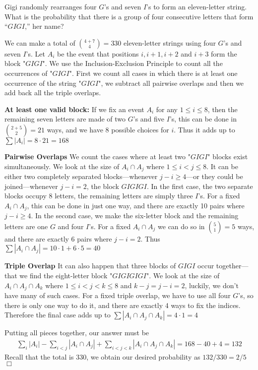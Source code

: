  \begin{problem}
     Gigi randomly rearranges four $G$’s and seven $I$’s to form an eleven-letter string. What is the probability that there is a group of four consecutive letters that form “$GIGI$,” her name?
 \end{problem}

 \begin{solution}[$2/5$]
     We can make a total of $\binom{4+7}{4} = 330$ eleven-letter strings using four $G$'s and seven $I$'s. Let $A_i$ be the event that positions $i, i+1, i+2$ and $i+3$ form the block "$GIGI$". We use the Inclusion-Exclusion Principle to count all the occurrences of "$GIGI$". First we count all cases in which there is at least one occurrence of the string "$GIGI$", we subtract all pairwise overlaps and then we add back all the triple overlaps.

    \textbf{At least one valid block:} If we fix an event $A_i$ for any $1 \leq i \leq 8$, then the remaining seven letters are made of two $G$'s and five $I$'s, this can be done in $\binom{2+5}{2} = 21$ ways, and we have 8 possible choices for $i$. Thus it adds up to $\sum |A_i| = 8 \cdot 21 = 168 $ 

    \textbf{Pairwise Overlaps} We count the cases where at least two "$GIGI$" blocks exist simultaneously. We look at the size of $A_i \cap A_j$ where $1 \leq i<j \leq 8$. It can be either two completely separated blocks---whenever $j-i \geq 4$---or they could be joined---whenever $j-i = 2$, the block $GIGIGI$. In the first case, the two separate blocks occupy 8 letters, the remaining letters are simply three $I$'s. For a fixed $A_i \cap A_j$, this can be done in just one way, and there are exactly 10 pairs where $j-i \geq 4$. In the second case, we make the six-letter block and the remaining letters are one $G$ and four $I$'s. For a fixed $A_i \cap A_j$ we can do so in $\binom{5}{1} = 5$ ways, and there are exactly 6 pairs where $j-i = 2$. 
    Thus $\sum |A_i \cap A_j | = 10 \cdot 1 + 6 \cdot 5 = 40$

    \textbf{Triple Overlap} It can also happen that three blocks of $GIGI$ occur together---that we find the eight-letter block "$GIGIGIGI$". We look at the size of $A_i \cap A_j \cap A_k$ where $1 \leq i < j < k \leq 8$ and $k-j =j - i = 2$, luckily, we don't have many of such cases. For a fixed triple overlap, we have to use all four $G$'s, so there is only one way to do it, and there are exactly 4 ways to fix the indices. Therefore the final case adds up to $\sum | A_i \cap A_j \cap A_k | = 4 \cdot 1 = 4$

    Putting all pieces together, our answer must be 
    \begin{align*}
        \sum_i |A_i| - \sum_{i < j} |A_i \cap A_j| + \sum _{i < j < k} |A_i \cap A_j \cap A_k | 
        = 168 - 40 + 4 = 132
    \end{align*}
     Recall that the total is 330, we obtain our desired probability as $132/330 = 2/5$ $\Box$  
 \end{solution}

